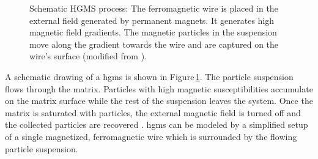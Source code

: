 \begin{figure}[H]
\centering

\caption[Schematic HGMS process]{Schematic HGMS process: The ferromagnetic wire is placed in the external field generated by permanent magnets. It generates high magnetic field gradients. The magnetic particles in the suspension move along the gradient towards the wire and are captured on the wire's surface (modified from \cite{FranzrebHabil}).  
\label{fig:hgms}
}
\end{figure}

A schematic drawing of a \gls{hgms} is shown in Figure\,\ref{fig:hgms}. The particle suspension flows through the matrix. Particles with high magnetic susceptibilities accumulate on the matrix surface while the rest of the suspension leaves the system. Once the matrix is saturated with particles, the external magnetic field is turned off and the collected particles are recovered \cite{svoboda2004magnetic,gerber1983high,ditsch2005high}. \gls{hgms} can be modeled by a simplified setup of a single magnetized, ferromagnetic wire which is surrounded by the flowing particle suspension. %

